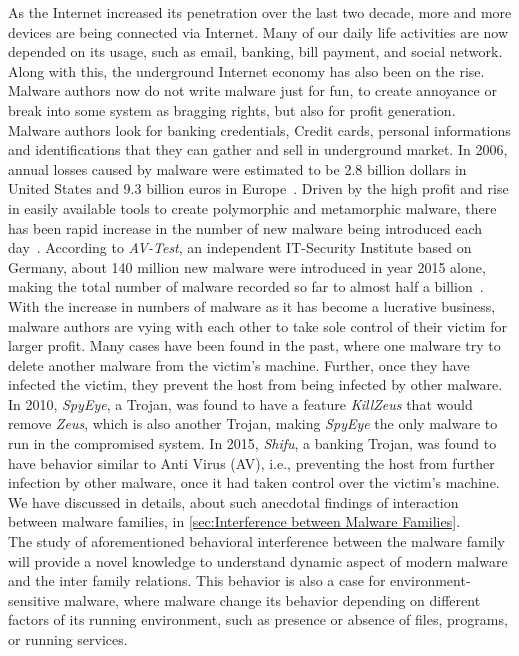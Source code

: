 As the Internet increased its penetration over the last two decade, more and more devices are being connected via Internet.
Many of our daily life activities are now depended on its usage, such as email, banking, bill payment, and social network.
Along with this, the underground Internet economy has also been on the rise.
Malware authors now do not write malware just for fun, to create annoyance or break into some system as bragging rights, but also for profit generation.
Malware authors look for banking credentials, Credit cards, personal informations and identifications that they can gather and sell in underground market.
In 2006, annual losses caused by malware were estimated to be 2.8 billion dollars in United States and 9.3 billion euros in Europe~\cite[]{moore2009economics}.
Driven by the high profit and rise in easily available tools to create polymorphic and metamorphic malware, there has been rapid increase in the number of new malware being introduced each day~\cite[]{tian}.
According to \emph{AV-Test}, an independent IT-Security Institute based on Germany, about 140 million new malware were introduced in year 2015 alone, making the total number of malware recorded so far to almost half a billion~\cite[]{avtest}.
\\
With the increase in numbers of malware as it has become a lucrative business, malware authors are vying with each other to take sole control of their victim for larger profit.
Many cases have been found in the past, where one malware try to delete another malware from the victim's machine.
Further, once they have infected the victim, they prevent the host from being infected by other malware.
In 2010, \emph{SpyEye}, a Trojan, was found to have a feature \emph{KillZeus} that would remove \emph{Zeus}, which is also another Trojan, making \emph{SpyEye} the only malware to run in the compromised system.
In 2015, \emph{Shifu}, a banking Trojan, was found to have behavior similar to Anti Virus (AV), i.e., preventing the host from further infection by other malware, once it had taken control over the victim's machine.
We have discussed in details, about such anecdotal findings of interaction between malware families, in \autoref{sec:Interference between Malware Families}.\\
The study of aforementioned behavioral interference between the malware family will provide a novel knowledge to understand dynamic aspect of modern malware and the inter family relations.
This behavior is also a case for environment-sensitive malware, where malware change its behavior depending on different factors of its running environment, such as presence or absence of files, programs, or running services.
